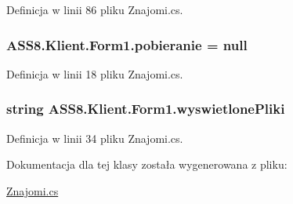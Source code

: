 Definicja w linii 86 pliku Znajomi.cs.\hypertarget{a00003_a21006ffcd0ae9b655d6232326c0783e}{
\subsubsection[{pobieranie}]{ {\bf ASS8.Klient.Form1.pobieranie} = null}}
\label{d1/d7c/a00003_a21006ffcd0ae9b655d6232326c0783e}




Definicja w linii 18 pliku Znajomi.cs.\hypertarget{a00003_8647bc097f5550069c2ffa260182726e}{
\subsubsection[{wyswietlonePliki}]{\setlength{\rightskip}{0pt plus 5cm}string {\bf ASS8.Klient.Form1.wyswietlonePliki}}}
\label{d1/d7c/a00003_8647bc097f5550069c2ffa260182726e}




Definicja w linii 34 pliku Znajomi.cs.

Dokumentacja dla tej klasy została wygenerowana z pliku:\begin{CompactItemize}
\item 
\hyperlink{a00057}{Znajomi.cs}\end{CompactItemize}
